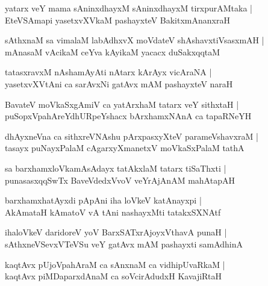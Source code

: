 \begin{shloka}
yatarx veY mama sAninxdhayxM sAninxdhayxM tirxpurAMtaka |\\
EteVSAmapi yasetxvXVkaM pashayxteV BakitxmAnanxraH 
\end{shloka}

\begin{shloka}
sAthxnaM sa vimalaM labAdhxvX moVdateV shAshavxtiVsasxmAH |\\
mAnasaM vAcikaM ceYva kAyikaM yacacx duSakxqqtaM 
\end{shloka}

\begin{shloka}
tatasxravxM nAshamAyAti nAtarx kArAyx vicAraNA |\\
yasetxvXVtAni ca sarAvxNi gatAvx mAM pashayxteV naraH 
\end{shloka}

\begin{shloka}
BavateV moVkaSxgAmiV ca yatArxhaM tatarx veY sithxtaH |\\
puSopxVpahAreYdhURpeYshacx bArxhamxNAnA ca tapaRNeYH 
\end{shloka}

\begin{shloka}
dhAyxneVna ca sithxreVNAshu pArxpasxyXteV parameVshavxraM |\\
tasayx puNayxPalaM cAgarxyXmanetxV moVkaSxPalaM tathA
\end{shloka}

\begin{shloka}
sa barxhamxloVkamAsAdayx tatAkxlaM tatarx tiSaThxti |\\
punasasxqqSwTx BaveVdedxVvoV veYrAjAnAM mahAtapAH
\end{shloka}

\begin{shloka}
barxhamxhatAyxdi pApAni iha loVkeV katAnayxpi |\\
AkAmataH kAmatoV vA tAni nashayxMti tatakxSXNAtf 
\end{shloka}

\begin{shloka}
ihaloVkeV daridoreV yoV BarxSATxrAjoyxVthavA punaH |\\
sAthxneVSevxVTeVSu veY gatAvx mAM pashayxti samAdhinA 
\end{shloka}

\begin{shloka}
kaqtAvx pUjoVpahAraM ca sAnxnaM ca vidhipUvaRkaM |\\
kaqtAvx piMDaparxdAnaM ca soVcirAdudxH KavajiRtaH 
\end{shloka}

